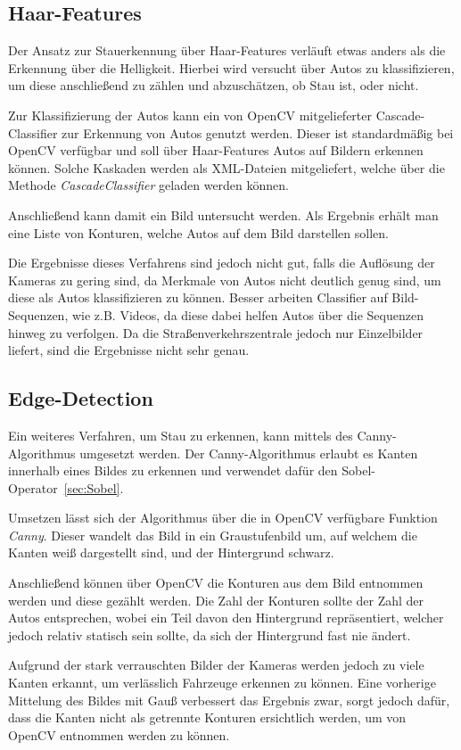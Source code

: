 \subsection{Haar-Features}
Der Ansatz zur Stauerkennung über Haar-Features verläuft etwas anders als die Erkennung über die Helligkeit.
Hierbei wird versucht über Autos zu klassifizieren, um diese anschließend zu zählen und abzuschätzen, ob Stau ist, oder nicht.

Zur Klassifizierung der Autos kann ein von OpenCV mitgelieferter Cascade-Classifier zur Erkennung von Autos genutzt werden.
Dieser ist standardmäßig bei OpenCV verfügbar und soll über Haar-Features Autos auf Bildern erkennen können.
Solche Kaskaden werden als XML-Dateien mitgeliefert, welche über die Methode {\em CascadeClassifier} geladen werden können.

Anschließend kann damit ein Bild untersucht werden. Als Ergebnis erhält man eine Liste von Konturen, welche Autos auf dem Bild darstellen sollen.

Die Ergebnisse dieses Verfahrens sind jedoch nicht gut, falls die Auflösung der Kameras zu gering sind, da Merkmale von Autos nicht deutlich genug sind, um diese als Autos klassifizieren zu können.
Besser arbeiten Classifier auf Bild-Sequenzen, wie z.B. Videos, da diese dabei helfen Autos über die Sequenzen hinweg zu verfolgen.
Da die Straßenverkehrszentrale jedoch nur Einzelbilder liefert, sind die Ergebnisse nicht sehr genau.

\subsection{Edge-Detection}
Ein weiteres Verfahren, um Stau zu erkennen, kann mittels des Canny-Algorithmus umgesetzt werden.
Der Canny-Algorithmus erlaubt es Kanten innerhalb eines Bildes zu erkennen und verwendet dafür den Sobel-Operator~\ref{sec:Sobel}.

Umsetzen lässt sich der Algorithmus über die in OpenCV verfügbare Funktion {\em Canny}.
Dieser wandelt das Bild in ein Graustufenbild um, auf welchem die Kanten weiß dargestellt sind, und der Hintergrund schwarz.

Anschließend können über OpenCV die Konturen aus dem Bild entnommen werden und diese gezählt werden.
Die Zahl der Konturen sollte der Zahl der Autos entsprechen, wobei ein Teil davon den Hintergrund repräsentiert, welcher jedoch relativ statisch sein sollte, da sich der Hintergrund fast nie ändert.

Aufgrund der stark verrauschten Bilder der Kameras werden jedoch zu viele Kanten erkannt, um verlässlich Fahrzeuge erkennen zu können.
Eine vorherige Mittelung des Bildes mit Gauß verbessert das Ergebnis zwar, sorgt jedoch dafür, dass die Kanten nicht als getrennte Konturen ersichtlich werden, um von OpenCV entnommen werden zu können.
	
